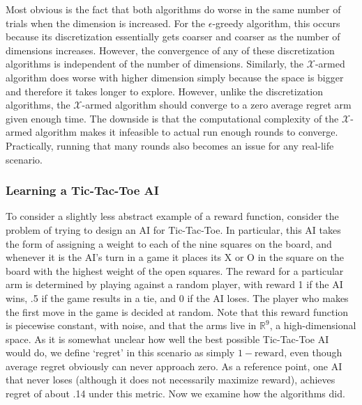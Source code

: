 Most obvious is the fact that both algorithms do worse in the same
number of trials when the dimension is increased.  For the
$\epsilon$-greedy algorithm, this occurs because its discretization
essentially gets coarser and coarser as the number of dimensions
increases.  However, the convergence of any of these discretization
algorithms is independent of the number of dimensions.  Similarly, the
$\mathcal{X}$-armed algorithm does worse with higher dimension simply
because the space is bigger and therefore it takes longer to explore.
However, unlike the discretization algorithms, the $\mathcal{X}$-armed
algorithm should converge to a zero average regret arm given enough
time.  The downside is that the computational complexity of the
$\mathcal{X}$-armed algorithm makes it infeasible to actual run enough
rounds to converge.  Practically, running that many rounds also
becomes an issue for any real-life scenario.

\subsubsection{Learning a Tic-Tac-Toe AI}
To consider a slightly less abstract example of a reward function,
consider the problem of trying to design an AI for Tic-Tac-Toe.  In
particular, this AI takes the form of assigning a weight to each of
the nine squares on the board, and whenever it is the AI's turn in a
game it places its X or O in the square on the board with the highest
weight of the open squares.  The reward for a particular arm is
determined by playing against a random player, with reward 1 if the AI
wins, .5 if the game results in a tie, and 0 if the AI loses.  The
player who makes the first move in the game is decided at random.
Note that this reward function is piecewise constant, with noise, and
that the arms live in $\mathbb{R}^9$, a high-dimensional space.  As it
is somewhat unclear how well the best possible Tic-Tac-Toe AI would
do, we define `regret' in this scenario as simply $1-\text{reward}$,
even though average regret obviously can never approach zero.  As a
reference point, one AI that never loses (although it does not
necessarily maximize reward), achieves regret of about .14 under this
metric.  Now we examine how the algorithms did.

